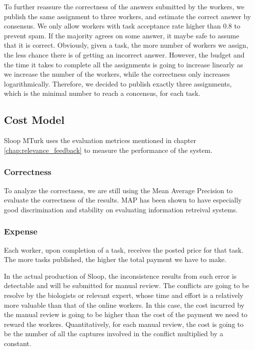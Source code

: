 To further reassure the correctness of the answers submitted by the workers, we publish the same assignment to three workers, and estimate the correct answer by consensus. We only allow workers with task acceptance rate higher than 0.8 to prevent spam. If the majority agrees on some answer, it maybe safe to assume that it is correct. Obviously, given a task, the more number of workers we assign, the less chance there is of getting an incorrect answer. However, the budget and the time it takes to complete all the assignments is going to increase linearly as we increase the number of the workers, while the correctness only increases logarithmically. Therefore, we decided to publish exactly three assignments, which is the minimal number to reach a concensus, for each task.


\subsection{Cost Model}

Sloop MTurk uses the evaluation metrices mentioned in chapter \ref{chap:relevance_feedback} to measure the performance of the system.

\subsubsection{Correctness}
To analyze the correctness, we are still using the Mean Average Precision to evaluate the correctness of the results. MAP has been shown to have especially good discrimination and stability on evaluating information retreival systems\cite{manning2008introduction}.

\subsubsection{Expense}
Each worker, upon completion of a task, receives the posted price for that task. The more tasks published, the higher the total payment we have to make.

In the actual production of Sloop, the inconsistence results from such error is detectable and will be submitted for manual review. The conflicts are going to be resolve by the biologists or relevant expert, whose time and effort is a relatively more valuable than that of the online workers. In this case, the cost incurred by the manual review is going to be higher than the cost of the payment we need to reward the workers. Quantitatively, for each manual review, the cost is going to be the number of all the captures involved in the conflict multiplied by a constant.

